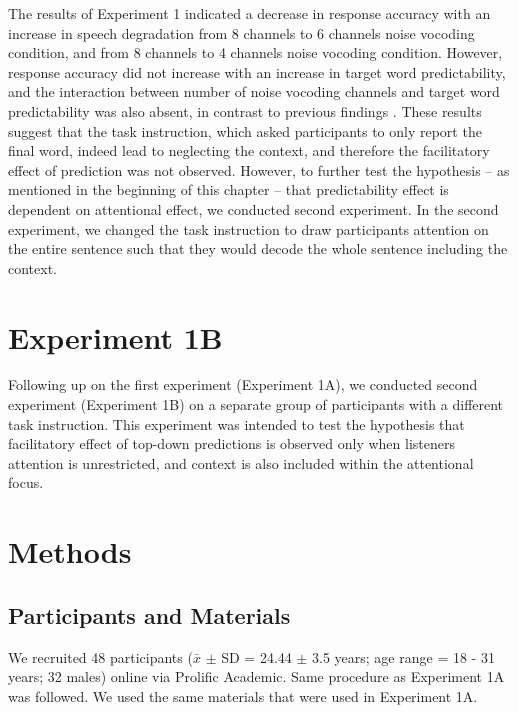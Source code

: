 \documentclass[a4paper, nobind]{templates/ociamthesis}
\begin{document}
The results of Experiment 1 indicated a decrease in response accuracy with an increase in speech degradation from 8 channels to 6 channels noise vocoding condition, and from 8 channels to 4 channels noise vocoding condition.
However, response accuracy did not increase with an increase in target word predictability,
and the interaction between number of noise vocoding channels and target word predictability was also absent, in contrast to previous findings \autocites{Obleser2007,Obleser2011}[see also][]{Hunter2018}.
These results suggest that the task instruction, which asked participants to only report the final word, indeed lead to neglecting the context, and therefore the facilitatory effect of prediction was not observed.
However, to further test the hypothesis -- as mentioned in the beginning of this chapter -- that predictability effect is dependent on attentional effect, we conducted second experiment.
In the second experiment, we changed the task instruction to draw participants attention on the entire sentence such that they would decode the whole sentence including the context.

\hypertarget{experiment-1b}{%
\section{Experiment 1B}\label{experiment-1b}}

Following up on the first experiment (Experiment 1A), we conducted second experiment (Experiment 1B) on a separate group of participants with a different task instruction.
This experiment was intended to test the hypothesis that facilitatory effect of top-down predictions is observed only when listeners attention is unrestricted, and context is also included within the attentional focus.

\hypertarget{methods-1}{%
\section{Methods}\label{methods-1}}

\hypertarget{participants-and-materials}{%
\subsection{Participants and Materials}\label{participants-and-materials}}

We recruited 48 participants (\(\bar{x}\) \(\pm\) SD = 24.44 \(\pm\) 3.5 years; age range = 18 - 31 years; 32 males) online via Prolific Academic.
Same procedure as Experiment 1A was followed.
We used the same materials that were used in Experiment 1A.
\end{document}
